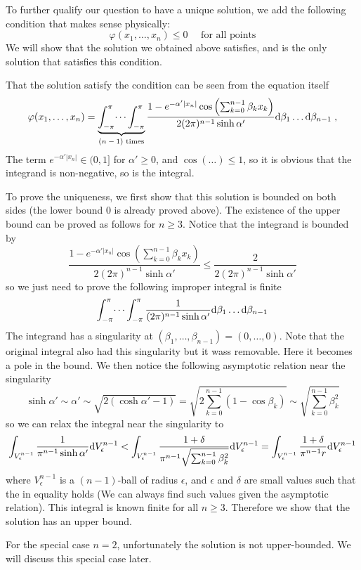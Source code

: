 \documentclass[10pt,a4paper,draft]{article}
\begin{document}
	To further qualify our question to have a unique solution, we add the following condition that makes sense physically: 
\[
\varphi(x_1,\dots,x_n) \leq 0 \quad\text{ for all points}
\]
	We will show that the solution we obtained above satisfies, and is the only solution that satisfies this condition.
	
	That the solution satisfy the condition can be seen from the equation itself
	 \[
		 \varphi(x_1,\dots,x_n) = \underbrace{\int_{-\pi}^{\pi}\dots\int_{-\pi}^{\pi}}_{\text{$(n-1)$ times}}\frac{1 - e^{-\alpha' |x_n|}\cos\left(\sum_{k=0}^{n-1}\beta_k x_k\right)}{2(2\pi)^{n-1}\sinh\alpha'}\mathrm{d}\beta_1\dots\mathrm{d}\beta_{n-1}\;,
	\]
	The term $e^{-\alpha'|x_n|} \in (0, 1]$ for $\alpha' \geq 0$, and $\cos(\dots) \leq 1$, so it is obvious that the integrand is non-negative, so is the integral.
	
	To prove the uniqueness, we first show that this solution is bounded on both sides (the lower bound $0$ is already proved above). The existence of the upper bound can be proved as follows for $n \geq 3$. Notice that the integrand is bounded by
	\[
	\frac{1 - e^{-\alpha' |x_n|}\cos\left(\sum_{k=0}^{n-1}\beta_k x_k\right)}{2(2\pi)^{n-1}\sinh\alpha'} \leq \frac{2}{2(2\pi)^{n-1}\sinh\alpha'}
	\]
	so we just need to prove the following improper integral is finite
	\[ \int_{-\pi}^{\pi}\dots\int_{-\pi}^{\pi}\frac{1}{(2\pi)^{n-1}\sinh\alpha'}\mathrm{d}\beta_1\dots\mathrm{d}\beta_{n-1}
	\]
	The integrand has a singularity at $(\beta_1,\dots,\beta_{n-1}) = (0,\dots,0)$. Note that the original integral also had this singularity but it wass removable. Here it becomes a pole in the bound. We then notice the following asymptotic relation near the singularity
	\[
	\sinh\alpha' \sim \alpha' \sim\sqrt{2(\cosh\alpha' - 1)} = \sqrt{2\sum_{k=0}^{n-1}(1-\cos\beta_k)} \sim \sqrt{\sum_{k=0}^{n-1}\beta_k^2}
	\]
	so we can relax the integral near the singularity to
	\[
	\int_{V^{n-1}_\epsilon}\frac{1}{\pi^{n-1}\sinh\alpha'}\mathrm{d} V^{n-1}_\epsilon < \int_{V^{n-1}_\epsilon}\frac{1 + \delta}{\pi^{n-1}\sqrt{\sum_{k=0}^{n-1}\beta_k^2}}\mathrm{d} V^{n-1}_\epsilon = \int_{V^{n-1}_\epsilon}\frac{1 + \delta}{\pi^{n-1}r}\mathrm{d} V^{n-1}_\epsilon
	\]
	where $V^{n-1}_\epsilon$ is a $(n-1)$-ball of radius $\epsilon$, and $\epsilon$ and $\delta$ are small values such that the in equality holds (We can always find such values given the asymptotic relation). This integral is known finite for all $n\ge3$. Therefore we show that the solution has an upper bound.
	
	For the special case $n = 2$, unfortunately the solution is not upper-bounded. We will discuss this special case later.
	
\end{document}
